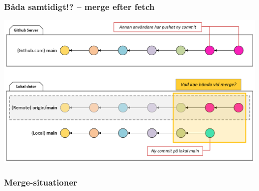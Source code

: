 \begin{frame}
    \frametitle{Båda samtidigt!? -- merge efter fetch}

    \begin{center}
            \includegraphics[width=\textwidth]{figs/local_remote_fetch_merge_conflict.png}
    \end{center}

\end{frame}


\begin{frame}
    \frametitle{Merge-situationer}

    \begin{itemize}
    \end{itemize}

\end{frame}

